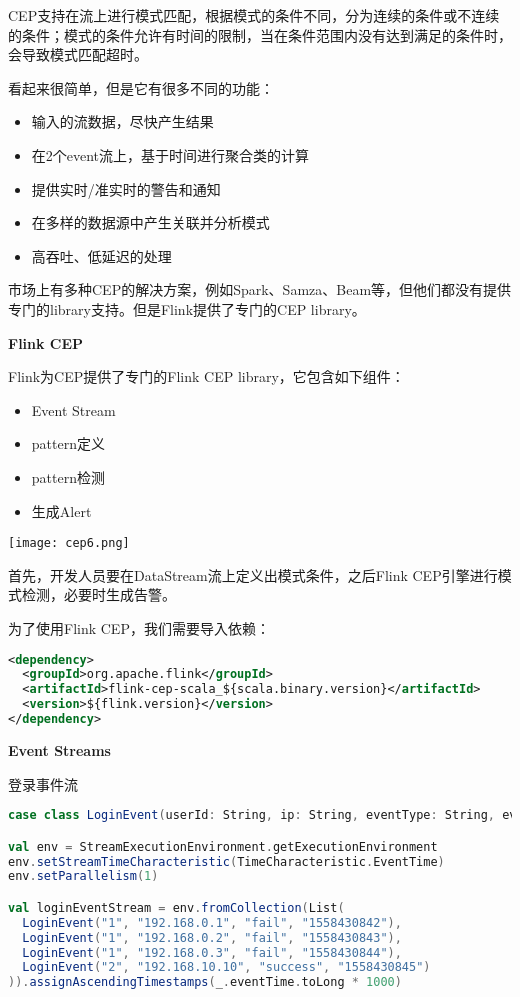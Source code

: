 \documentclass[oneside]{ctexbook}
\begin{document}
CEP支持在流上进行模式匹配，根据模式的条件不同，分为连续的条件或不连续的条件；模式的条件允许有时间的限制，当在条件范围内没有达到满足的条件时，会导致模式匹配超时。

看起来很简单，但是它有很多不同的功能：

\begin{itemize}
\item 输入的流数据，尽快产生结果
\item 在2个event流上，基于时间进行聚合类的计算
\item 提供实时/准实时的警告和通知
\item 在多样的数据源中产生关联并分析模式
\item 高吞吐、低延迟的处理
\end{itemize}

市场上有多种CEP的解决方案，例如Spark、Samza、Beam等，但他们都没有提供专门的library支持。但是Flink提供了专门的CEP library。

\textbf{Flink CEP}

Flink为CEP提供了专门的Flink CEP library，它包含如下组件：

\begin{itemize}
\item Event Stream
\item pattern定义
\item pattern检测
\item 生成Alert
\end{itemize}

\noindent \texttt{[image: cep6.png]}

首先，开发人员要在DataStream流上定义出模式条件，之后Flink CEP引擎进行模式检测，必要时生成告警。

为了使用Flink CEP，我们需要导入依赖：

\begin{lstlisting}[language=xml]
<dependency>
  <groupId>org.apache.flink</groupId>
  <artifactId>flink-cep-scala_${scala.binary.version}</artifactId>
  <version>${flink.version}</version>
</dependency>
\end{lstlisting}

\textbf{Event Streams}

登录事件流

\begin{lstlisting}[language=scala]
case class LoginEvent(userId: String, ip: String, eventType: String, eventTime: String)

val env = StreamExecutionEnvironment.getExecutionEnvironment
env.setStreamTimeCharacteristic(TimeCharacteristic.EventTime)
env.setParallelism(1)

val loginEventStream = env.fromCollection(List(
  LoginEvent("1", "192.168.0.1", "fail", "1558430842"),
  LoginEvent("1", "192.168.0.2", "fail", "1558430843"),
  LoginEvent("1", "192.168.0.3", "fail", "1558430844"),
  LoginEvent("2", "192.168.10.10", "success", "1558430845")
)).assignAscendingTimestamps(_.eventTime.toLong * 1000)
\end{lstlisting}
\end{document}
